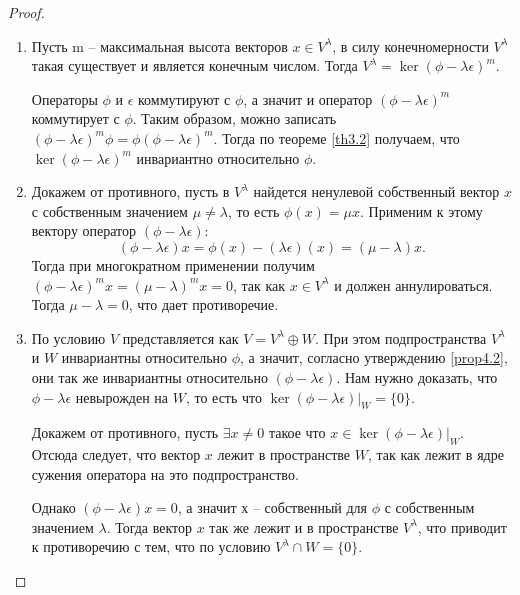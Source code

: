 \begin{proof}~
    \begin{enumerate}
        \item Пусть m -- максимальная высота векторов $x \in V^{\lambda}$, в силу конечномерности 
              $V^{\lambda}$ такая существует и является конечным числом.
              Тогда $V^{\lambda} = \ker (\phi - \lambda \epsilon)^m$. 
              
              Операторы $\phi$ и $\epsilon$
              коммутируют с $\phi$, а значит и оператор $(\phi - \lambda \epsilon)^m$ коммутирует с 
              $\phi$. Таким образом, можно записать 
              $(\phi - \lambda \epsilon)^m \phi = \phi (\phi - \lambda \epsilon)^m$. 
              Тогда по теореме \ref{th3.2} получаем, что $\ker (\phi - \lambda \epsilon)^m$ 
              инвариантно относительно $\phi$. 
        \item Докажем от противного, пусть в $V^{\lambda}$ найдется ненулевой собственный вектор $x$ 
              с собственным значением $\mu \neq \lambda$, то есть $\phi(x) = \mu x$. Применим к этому 
              вектору оператор $(\phi - \lambda \epsilon)$:  
              $$(\phi - \lambda \epsilon) x = \phi(x) - (\lambda \epsilon)(x) = (\mu - \lambda) x.$$ 
              Тогда при многократном применении 
              получим $(\phi - \lambda \epsilon)^m x = (\mu - \lambda)^m x = 0$,
              так как $x \in V^{\lambda}$ и должен аннулироваться. Тогда $\mu - \lambda = 0$, 
              что дает противоречие.
        \item По условию $V$ представляется как $V = V^{\lambda} \oplus W$. При этом подпространства 
              $V^{\lambda}$ и $W$ инвариантны относительно $\phi$, а значит, согласно утверждению 
              \ref{prop4.2}, они так же инвариантны относительно $(\phi - \lambda \epsilon)$. 
              Нам нужно доказать, что $\phi - \lambda \epsilon$ невырожден на $W$, то есть что 
              $\ker (\phi - \lambda \epsilon) \vert_{W} = \{0\}$.
              
              Докажем от противного, пусть $\exists x \neq 0$ такое что 
              $x \in \ker (\phi - \lambda \epsilon) \vert_{W}$. 
              Отсюда следует, что вектор $x$ лежит в пространстве $W$, так как лежит в ядре сужения
              оператора на это подпространство.

              Однако $(\phi - \lambda \epsilon) x = 0$, а значит х -- собственный для $\phi$ 
              с собственным значением $\lambda$. Тогда вектор $x$ так же лежит и в пространстве 
              $V^{\lambda}$, что приводит к 
              противоречию с тем, что по условию $V^{\lambda} \cap W = \{0\}$.
    \end{enumerate}
\end{proof}


